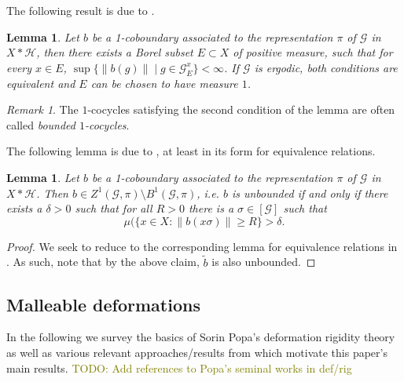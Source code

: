 \documentclass[a4paper,11pt]{article}
\numberwithin{equation}{section}
\newtheorem{lem}[thm]{Lemma}
\theoremstyle{definition}
\theoremstyle{remark}
\newtheorem{rem}[thm]{Remark}
\numberwithin{equation}{section}
\newcommand{\rG}{\mathcal{G}}
\def\H{\mathcal H}
\providecommand{\norm}[1]{\lVert#1\rVert}
\numberwithin{equation}{section}
\begin{document}
The following result is due to \textcite[Theorem 3.19, Lemma 3.20]{anatharaman:05}.

\begin{lem}\label{bound}
Let $b$ be a 1-coboundary associated to the representation $\pi$ of $\rG$ in $X\ast \H$, then there exists a Borel subset $E\subset X$ of positive measure, such that for every $x\in E$, $\sup\{\norm{b(g)}\mid g\in \rG_E^x\}<\infty$. If $\rG$ is ergodic, both conditions are equivalent and $E$ can be chosen to have measure $1$.
\end{lem}

\begin{rem}
    The $1$-cocycles satisfying the second condition of the lemma are often called {\it bounded $1$-cocycles}.
\end{rem}



The following lemma is due to \textcite[Lemmas 2.1, 2.2]{hoff:16}, at least in its form for equivalence relations.

\begin{lem}\label{unbound}      
    Let $b$ be a 1-coboundary associated to the representation $\pi$ of $\rG$ in $X\ast \H$. Then $ b \in Z^{1}(\rG,\pi)\setminus B^{1}(\rG,\pi) $, i.e. $ b $ is \textit{unbounded} if and only if there exists a $ \delta >0 $ such that for all $ R>0 $ there is a $ \sigma\in [\rG] $ such that 
    \[
        \mu(\{x\in X: \norm{b(x\sigma)} \geq R\} > \delta.
    \]
\end{lem}

\begin{proof}
    We seek to reduce to the corresponding lemma for equivalence relations in \cite[Lemma 2.2]{hoff:16}. As such, note that by the above claim, $\widetilde{b}$ is also unbounded.
\end{proof}










\subsection{Malleable deformations}

In the following we survey the basics of Sorin Popa's deformation rigidity theory as well as various relevant approaches/results from \textcite{dSHH:21} which motivate this paper's main results. \textcolor{olive}{TODO: Add references to Popa's seminal works in def/rig}
\end{document}
